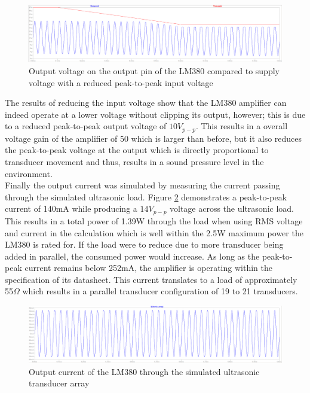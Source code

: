 \begin{figure}[ht!]
    \centering
    \includegraphics[width=\textwidth]{Figures/Design/amplifier/voutVsvsupplyInput100mv.png}
    \caption{Output voltage on the output pin of the LM380 compared to supply voltage with a reduced peak-to-peak input voltage}
    \label{fig:lm380outVsSupply100mvin}
\end{figure}

The results of reducing the input voltage show that the LM380 amplifier can indeed operate at a lower voltage without clipping its output, however; this is due to a reduced peak-to-peak output voltage of $10V_{p-p}$. This results in a overall voltage gain of the amplifier of 50 which is larger than before, but it also reduces the peak-to-peak voltage at the output which is directly proportional to transducer movement and thus, results in a sound pressure level in the environment.\\
Finally the output current was simulated by measuring the current passing through the simulated ultrasonic load. Figure \ref{fig:lm380Iout} demonstrates a peak-to-peak current of 140mA while producing a $14V_{p-p}$ voltage across the ultrasonic load. This results in a total power of 1.39W through the load when using RMS voltage and current in the calculation which is well within the 2.5W maximum power the LM380 is rated for. If the load were to reduce due to more transducer being added in parallel, the consumed power would increase. As long as the peak-to-peak current remains below 252mA, the amplifier is operating within the specification of its datasheet. This current translates to a load of approximately 55$\Omega$ which results in a parallel transducer configuration of 19 to 21 transducers.

\begin{figure}[ht!]
    \centering
    \includegraphics[width=\textwidth]{Figures/Design/amplifier/ioutusonic.png}
    \caption{Output current of the LM380 through the simulated ultrasonic transducer array}
    \label{fig:lm380Iout}
\end{figure}

